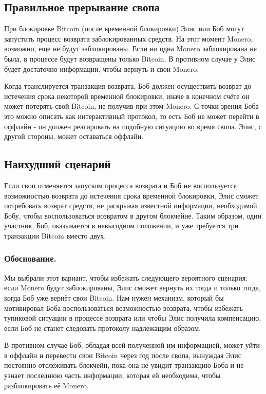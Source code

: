 \documentclass{llncs}
\begin{document}
\subsection{Правильное прерывание свопа}
При блокировке Bitcoin (после временной блокировки) Элис или Боб могут запустить процесс возврата заблокированных средств. На этот момент Monero, возможно, еще не будут заблокированы. Если ни одна Monero заблокирована не была, в процессе будут возвращены только Bitcoin. В противном случае у Элис будет достаточно информации, чтобы вернуть и свои Monero.

Когда транслируется транзакция возврата, Боб должен осуществить возврат до истечения срока некоторой временной блокировки, иначе в конечном счёте он может потерять свой Bitcoin, не получив при этом Monero. С точки зрения Боба это можно описать как интерактивный протокол, то есть Боб не может перейти в оффлайн - он должен реагировать на подобную ситуацию во время свопа. Элис, с другой стороны, может оставаться оффлайн.

\subsection{Наихудший сценарий}
Если своп отменяется запуском процесса возврата и Боб не воспользуется возможностью возврата до истечения срока временной блокировки, Элис сможет потребовать возврат средств, не раскрывая известной информации, необходимой Бобу, чтобы воспользоваться возвратом в другом блокчейне. Таким образом, один участник, Боб, оказывается в невыгодном положении, и уже требуется три транзакции Bitcoin вместо двух.

\subsubsection{Обоснование.}
\label{worstCaseRationale}
Мы выбрали этот вариант, чтобы избежать следующего вероятного сценария: если Monero будут заблокированы, Элис сможет вернуть их тогда и только тогда, когда Боб уже вернёт свои Bitcoin. Нам нужен механизм, который бы мотивировал Боба воспользоваться возможностью возврата, чтобы избежать тупиковой ситуации в процессе возврата или чтобы Элис получила компенсацию, если Боб не станет следовать протоколу надлежащим образом.

В противном случае Боб, обладая всей полученной им информацией, может уйти в оффлайн и перевести свои Bitcoin через год после свопа, вынуждая Элис постоянно отслеживать блокчейн, пока она не увидит транзакцию Боба и не узнает последнюю часть информации, которая ей необходима, чтобы разблокировать её Monero.
\end{document}

